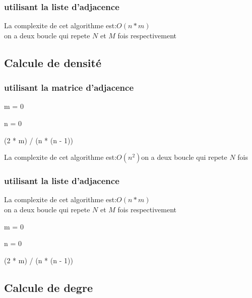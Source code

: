 \documentclass{report}
\begin{document}
\subsubsection{utilisant la liste d'adjacence}
La complexite de cet algorithme est:\(O(n*m)\)\\
on a deux boucle qui repete \(N\) et \(M\) fois respectivement
\begin{algorithm}
\caption{}
\end{algorithm}

\subsection{Calcule de densité}

\subsubsection{utilisant la matrice d'adjacence}
\begin{algorithm}
m = 0

n = 0

\Return (2 * m) / (n * (n - 1))
\caption{}
\end{algorithm}
La complexite de cet algorithme est:\(O(n^{2})\)on a deux boucle qui repete \(N\) fois

\subsubsection{utilisant la liste d'adjacence}
La complexite de cet algorithme est:\(O(n*m)\)\\
on a deux boucle qui repete \(N\) et \(M\) fois respectivement
\begin{algorithm}
m = 0

n = 0

\Return (2 * m) / (n * (n - 1))
\caption{}
\end{algorithm}

\subsection{Calcule de degre}
\end{document}

